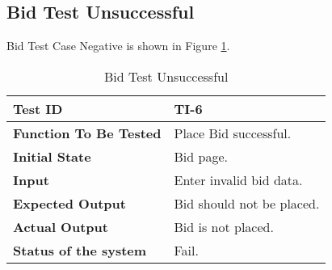 \subsection{Bid Test Unsuccessful}
Bid Test Case Negative is shown in Figure \ref{tt6}.
\begin{table}[!h]
    \centering
    \begin{tabular}{|p{5cm}|p{8cm}|}
        \hline
        \textbf{Test ID} & \textbf{TI-6}\\
        \hline
        \textbf{Function To Be Tested} & Place Bid successful. \\
        \hline
        \textbf{Initial State} & Bid page.\\
        \hline
        \textbf{Input} & Enter invalid bid data.\\
        \hline
        \textbf{Expected Output} & Bid should not be placed.\\
        \hline
        \textbf{Actual Output} & Bid is not placed.\\
         \hline
         \textbf{Status of the system} & Fail.\\
         \hline
    \end{tabular}
    \caption{Bid Test Unsuccessful}
    \label{tt6}
\end{table}